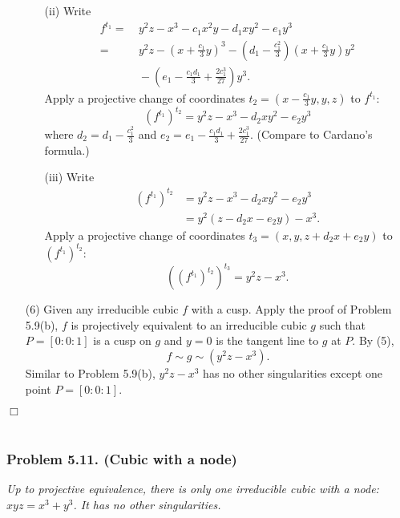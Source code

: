 \documentclass{article}
\begin{document}
\begin{enumerate}
\begin{enumerate}
  \item[(ii)]
    Write
    \begin{align*}
      f^{t_1}
      =& \: y^2z - x^3 - c_1 x^2y - d_1 xy^2 - e_1 y^3 \\
      =& \: y^2z - \left( x+\frac{c_1}{3}y \right)^3
        - \left( d_1-\frac{c_1^2}{3} \right) \left( x+\frac{c_1}{3}y \right)y^2 \\
        & \: - \left( e_1-\frac{c_1d_1}{3}+\frac{2c_1^3}{27} \right) y^3.
    \end{align*}
    Apply a projective change of coordinates
    $t_2 = \left( x-\frac{c_1}{3}y, y, z \right)$ to $f^{t_1}$:
    \[
      (f^{t_1})^{t_2} = y^2z - x^3 - d_2 xy^2 - e_2 y^3
    \]
    where $d_2 = d_1-\frac{c_1^2}{3}$ and $e_2 = e_1-\frac{c_1d_1}{3}+\frac{2c_1^3}{27}$.
    (Compare to Cardano's formula.)

  \item[(iii)]
    Write
    \begin{align*}
      (f^{t_1})^{t_2}
      &= y^2z - x^3 - d_2 xy^2 - e_2 y^3 \\
      &= y^2(z - d_2 x - e_2 y) - x^3.
    \end{align*}
    Apply a projective change of coordinates
    $t_3 = \left( x, y, z + d_2 x + e_2 y \right)$ to $(f^{t_1})^{t_2}$:
    \[
      ((f^{t_1})^{t_2})^{t_3} = y^2z - x^3.
    \]
  \end{enumerate}

\item[(6)]
  Given any irreducible cubic $f$ with a cusp.
  Apply the proof of Problem 5.9(b),
  $f$ is projectively equivalent to an irreducible cubic $g$
  such that $P = [0:0:1]$ is a cusp on $g$ and $y = 0$ is the tangent line to $g$ at $P$.
  By (5),
  \[
    f \sim g \sim (y^2 z-x^3).
  \]
  Similar to Problem 5.9(b),
  $y^2z - x^3$ has no other singularities except one point $P = [0:0:1]$.
\end{enumerate}
$\Box$ \\\\






\subsubsection*{Problem 5.11. (Cubic with a node)}
\emph{Up to projective equivalence,
there is only one irreducible cubic with a node: $xyz = x^3+y^3$.
It has no other singularities.} \\
\end{document}
